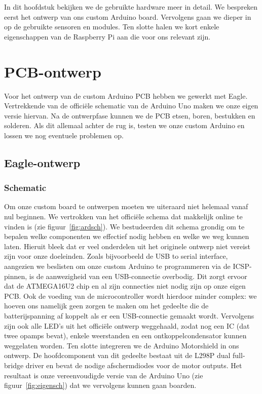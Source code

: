 In dit hoofdstuk bekijken we de gebruikte hardware meer in detail. We bespreken eerst het ontwerp van ons custom Arduino board. Vervolgens gaan we dieper in op de gebruikte sensoren en modules. Ten slotte halen we kort enkele eigenschappen van de Raspberry Pi aan die voor ons relevant zijn.

\section{PCB-ontwerp}
Voor het ontwerp van de custom Arduino PCB hebben we gewerkt met Eagle. Vertrekkende van de offici\"{e}le schematic van de Arduino Uno maken we onze eigen versie hiervan. Na de ontwerpfase kunnen we de PCB etsen, boren, bestukken en solderen. Als dit allemaal achter de rug is, testen we onze custom Arduino en lossen we nog eventuele problemen op. 
\subsection{Eagle-ontwerp}
\subsubsection{Schematic}
Om onze custom board te ontwerpen moeten we uiteraard niet helemaal vanaf nul beginnen. We vertrokken van het offici\"{e}le schema dat makkelijk online te vinden is (zie figuur~\vref{fig:ardsch}). We bestudeerden dit schema grondig om te bepalen welke componenten we effectief nodig hebben en welke we weg kunnen laten. Hieruit bleek dat er veel onderdelen uit het originele ontwerp niet vereist zijn voor onze doeleinden. Zoals bijvoorbeeld de USB to serial interface, aangezien we beslisten om onze custom Arduino te programmeren via de ICSP-pinnen, is de aanwezigheid van een USB-connectie overbodig. Dit zorgt ervoor dat de ATMEGA16U2 chip en al zijn connecties niet nodig zijn op onze eigen PCB. Ook de voeding van de microcontroller wordt hierdoor minder complex: we hoeven ons namelijk geen zorgen te maken om het gedeelte die de batterijspanning af koppelt als er een USB-connectie gemaakt wordt. Vervolgens zijn ook alle LED's uit het offici\"{e}le ontwerp weggehaald, zodat nog een IC (dat twee opamps bevat), enkele weerstanden en een ontkoppelcondensator kunnen weggelaten worden. Ten slotte integreren we de Arduino Motorshield in ons ontwerp. De hoofdcomponent van dit gedeelte bestaat uit de L298P dual full-bridge driver en bevat de nodige afschermdiodes voor de motor outputs. Het resultaat is onze vereenvoudigde versie van de Arduino Uno (zie figuur~\vref{fig:eigensch}) dat we vervolgens kunnen gaan boarden.

